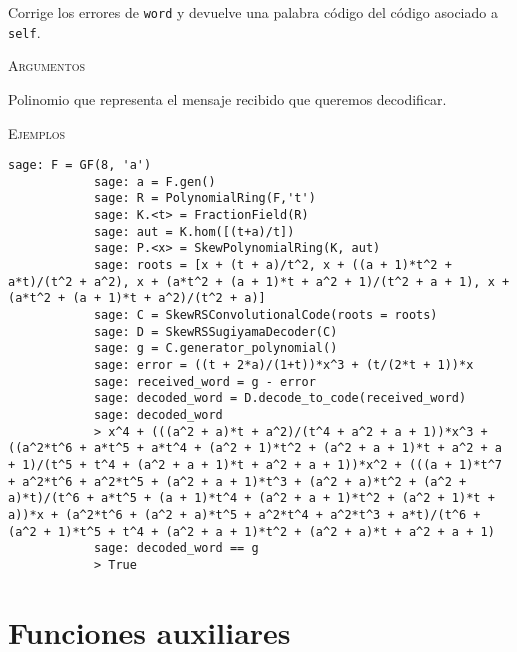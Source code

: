 \begin{description}[leftmargin=1em, font=\normalfont\ttfamily, style=nextline]
    \begin{description}[font=\ttfamily,style = nextline]
        \item[decode\_to\_code(self,word)] 
        Corrige los errores de \texttt{word} y devuelve una palabra código del código asociado a \texttt{self}.
        
        \textsc{Argumentos}

        \begin{description}[font=\normalfont\ttfamily]
            \item[word] Polinomio que representa el mensaje recibido que queremos decodificar.
        \end{description}

        \textsc{Ejemplos}


        \begin{lstlisting}[gobble=8]
            sage: F = GF(8, 'a')
            sage: a = F.gen()
            sage: R = PolynomialRing(F,'t')
            sage: K.<t> = FractionField(R)
            sage: aut = K.hom([(t+a)/t])
            sage: P.<x> = SkewPolynomialRing(K, aut)
            sage: roots = [x + (t + a)/t^2, x + ((a + 1)*t^2 + a*t)/(t^2 + a^2), x + (a*t^2 + (a + 1)*t + a^2 + 1)/(t^2 + a + 1), x + (a*t^2 + (a + 1)*t + a^2)/(t^2 + a)]
            sage: C = SkewRSConvolutionalCode(roots = roots) 
            sage: D = SkewRSSugiyamaDecoder(C)
            sage: g = C.generator_polynomial()
            sage: error = ((t + 2*a)/(1+t))*x^3 + (t/(2*t + 1))*x
            sage: received_word = g - error
            sage: decoded_word = D.decode_to_code(received_word)
            sage: decoded_word
            > x^4 + (((a^2 + a)*t + a^2)/(t^4 + a^2 + a + 1))*x^3 + ((a^2*t^6 + a*t^5 + a*t^4 + (a^2 + 1)*t^2 + (a^2 + a + 1)*t + a^2 + a + 1)/(t^5 + t^4 + (a^2 + a + 1)*t + a^2 + a + 1))*x^2 + (((a + 1)*t^7 + a^2*t^6 + a^2*t^5 + (a^2 + a + 1)*t^3 + (a^2 + a)*t^2 + (a^2 + a)*t)/(t^6 + a*t^5 + (a + 1)*t^4 + (a^2 + a + 1)*t^2 + (a^2 + 1)*t + a))*x + (a^2*t^6 + (a^2 + a)*t^5 + a^2*t^4 + a^2*t^3 + a*t)/(t^6 + (a^2 + 1)*t^5 + t^4 + (a^2 + a + 1)*t^2 + (a^2 + a)*t + a^2 + a + 1)
            sage: decoded_word == g
            > True
        \end{lstlisting}     
    \end{description}
\end{description}


\section{Funciones auxiliares}


